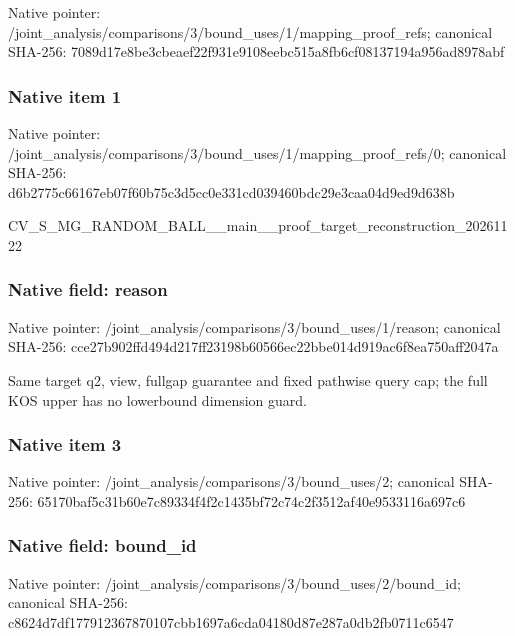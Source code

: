 \documentclass[10pt,a4paper]{article}
\begin{document}
Native pointer: /joint\_analysis/comparis\allowbreak{}ons/3/bound\_uses/1/mappi\allowbreak{}ng\_proof\_refs; canonical SHA-256: 7089d17e8be3cbeaef22f931\allowbreak{}e9108eebc515a8fb6cf08137\allowbreak{}194a956ad8978abf



\subsubsection{Native item 1}


Native pointer: /joint\_analysis/comparis\allowbreak{}ons/3/bound\_uses/1/mappi\allowbreak{}ng\_proof\_refs/0; canonical SHA-256: d6b2775c66167eb07f60b75c\allowbreak{}3d5cc0e331cd039460bdc29e\allowbreak{}3caa04d9ed9d638b


CV\_S\_MG\_RANDOM\_BALL\_\_mai\allowbreak{}n\_\_proof\_target\_reconstr\allowbreak{}uction\_20261122


\subsubsection{Native field: reason}


Native pointer: /joint\_analysis/comparis\allowbreak{}ons/3/bound\_uses/1/reaso\allowbreak{}n; canonical SHA-256: cce27b902ffd494d217ff231\allowbreak{}98b60566ec22bbe014d919ac\allowbreak{}6f8ea750aff2047a


Same target q2, view, fullgap guarantee and fixed pathwise query cap; the full KOS upper has no lowerbound dimension guard.


\subsubsection{Native item 3}


Native pointer: /joint\_analysis/comparis\allowbreak{}ons/3/bound\_uses/2; canonical SHA-256: 65170baf5c31b60e7c89334f\allowbreak{}4f2c1435bf72c74c2f3512af\allowbreak{}40e9533116a697c6



\subsubsection{Native field: bound\_id}


Native pointer: /joint\_analysis/comparis\allowbreak{}ons/3/bound\_uses/2/bound\allowbreak{}\_id; canonical SHA-256: c8624d7df177912367870107\allowbreak{}cbb1697a6cda04180d87e287\allowbreak{}a0db2fb0711c6547
\end{document}
